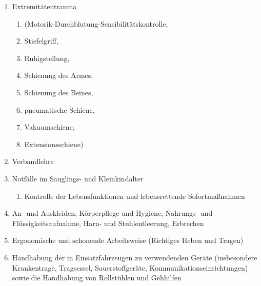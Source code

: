 \begin{enumerate}
\begin{enumerate}
      \dotfill
    \end{enumerate}
    \item
    Extremitätentrauma
    \begin{enumerate}
      \item
      (Motorik-Durchblutung-Sensibilitätskontrolle,
      \dotfill
      \item      Stiefelgriff,
      \dotfill
      \item      Ruhigstellung,
      \dotfill
      \item      Schienung des Armes,
      \dotfill
      \item      Schienung des Beines,
      \dotfill
      \item      pneumatische Schiene,
      \dotfill
      \item      Vakuumschiene,
      \dotfill
      \item      Extensionsschiene)
      \dotfill
    \end{enumerate}
    \item
    Verbandlehre
    \dotfill
    \item Notfälle im Säuglings- und Kleinkindalter
    \begin{enumerate}
      \item
      Kontrolle der Lebensfunktionen und lebensrettende Sofortmaßnahmen
      \dotfill
    \end{enumerate}
    \item An- und Auskleiden, Körperpflege und Hygiene, Nahrungs- und Flüssigkeitsaufnahme, Harn- und Stuhlentleerung,
    Erbrechen
    \dotfill
    \item Ergonomische und schonende Arbeitsweise (Richtiges Heben und Tragen)
    \dotfill
    \item Handhabung der in Einsatzfahrzeugen zu verwendenden Geräte  (insbesondere
    Krankentrage, Tragsessel,  Sauerstoffgeräte, Kommunikationseinrichtungen) sowie
    die  Handhabung von Rollstühlen und Gehhilfen
    \dotfill
    
  \end{enumerate}


